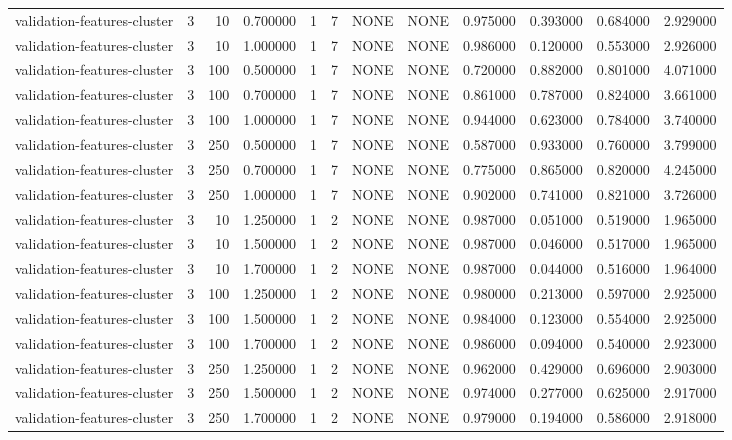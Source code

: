\begin{tabular}{lrrrllllrrrr}
validation-features-cluster & 3 & 10 & 0.700000 & 1 & 7 & NONE & NONE & 0.975000 & 0.393000 & 0.684000 & 2.929000 \\
validation-features-cluster & 3 & 10 & 1.000000 & 1 & 7 & NONE & NONE & 0.986000 & 0.120000 & 0.553000 & 2.926000 \\
validation-features-cluster & 3 & 100 & 0.500000 & 1 & 7 & NONE & NONE & 0.720000 & 0.882000 & 0.801000 & 4.071000 \\
validation-features-cluster & 3 & 100 & 0.700000 & 1 & 7 & NONE & NONE & 0.861000 & 0.787000 & 0.824000 & 3.661000 \\
validation-features-cluster & 3 & 100 & 1.000000 & 1 & 7 & NONE & NONE & 0.944000 & 0.623000 & 0.784000 & 3.740000 \\
validation-features-cluster & 3 & 250 & 0.500000 & 1 & 7 & NONE & NONE & 0.587000 & 0.933000 & 0.760000 & 3.799000 \\
validation-features-cluster & 3 & 250 & 0.700000 & 1 & 7 & NONE & NONE & 0.775000 & 0.865000 & 0.820000 & 4.245000 \\
validation-features-cluster & 3 & 250 & 1.000000 & 1 & 7 & NONE & NONE & 0.902000 & 0.741000 & 0.821000 & 3.726000 \\
validation-features-cluster & 3 & 10 & 1.250000 & 1 & 2 & NONE & NONE & 0.987000 & 0.051000 & 0.519000 & 1.965000 \\
validation-features-cluster & 3 & 10 & 1.500000 & 1 & 2 & NONE & NONE & 0.987000 & 0.046000 & 0.517000 & 1.965000 \\
validation-features-cluster & 3 & 10 & 1.700000 & 1 & 2 & NONE & NONE & 0.987000 & 0.044000 & 0.516000 & 1.964000 \\
validation-features-cluster & 3 & 100 & 1.250000 & 1 & 2 & NONE & NONE & 0.980000 & 0.213000 & 0.597000 & 2.925000 \\
validation-features-cluster & 3 & 100 & 1.500000 & 1 & 2 & NONE & NONE & 0.984000 & 0.123000 & 0.554000 & 2.925000 \\
validation-features-cluster & 3 & 100 & 1.700000 & 1 & 2 & NONE & NONE & 0.986000 & 0.094000 & 0.540000 & 2.923000 \\
validation-features-cluster & 3 & 250 & 1.250000 & 1 & 2 & NONE & NONE & 0.962000 & 0.429000 & 0.696000 & 2.903000 \\
validation-features-cluster & 3 & 250 & 1.500000 & 1 & 2 & NONE & NONE & 0.974000 & 0.277000 & 0.625000 & 2.917000 \\
validation-features-cluster & 3 & 250 & 1.700000 & 1 & 2 & NONE & NONE & 0.979000 & 0.194000 & 0.586000 & 2.918000 \\

\end{tabular}
